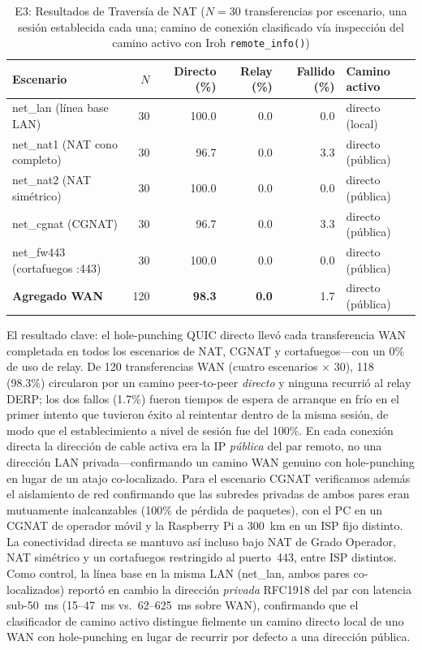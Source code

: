 \documentclass[journal]{IEEEtran}
\begin{document}
\begin{table}[t]
\centering
\caption{E3: Resultados de Traversía de NAT ($N{=}30$ transferencias por escenario, una sesión establecida cada una; camino de conexión clasificado vía inspección del camino activo con Iroh \texttt{remote\_info()})}
\label{tab:e3}
\footnotesize
\begin{tabular}{l r r r r l}
\toprule
\textbf{Escenario} & \textbf{$N$} & \textbf{Directo (\%)} & \textbf{Relay (\%)} & \textbf{Fallido (\%)} & \textbf{Camino activo} \\
\midrule
net\_lan   (línea base LAN)   & 30 & 100.0 & 0.0 & 0.0 & directo (local)  \\
net\_nat1  (NAT cono completo) & 30 & 96.7  & 0.0 & 3.3 & directo (pública) \\
net\_nat2  (NAT simétrico)    & 30 & 100.0 & 0.0 & 0.0 & directo (pública) \\
net\_cgnat (CGNAT)            & 30 & 96.7  & 0.0 & 3.3 & directo (pública) \\
net\_fw443 (cortafuegos :443) & 30 & 100.0 & 0.0 & 0.0 & directo (pública) \\
\midrule
\textbf{Agregado WAN}         & 120 & \textbf{98.3} & \textbf{0.0} & 1.7 & directo (pública) \\
\bottomrule
\end{tabular}
\end{table}

El resultado clave: el hole-punching QUIC directo llevó cada transferencia WAN completada en todos los escenarios de NAT, CGNAT y cortafuegos---con un 0\% de uso de relay. De 120 transferencias WAN (cuatro escenarios $\times$ 30), 118 (98.3\%) circularon por un camino peer-to-peer \emph{directo} y ninguna recurrió al relay DERP; los dos fallos (1.7\%) fueron tiempos de espera de arranque en frío en el primer intento que tuvieron éxito al reintentar dentro de la misma sesión, de modo que el establecimiento a nivel de sesión fue del 100\%. En cada conexión directa la dirección de cable activa era la IP \emph{pública} del par remoto, no una dirección LAN privada---confirmando un camino WAN genuino con hole-punching en lugar de un atajo co-localizado. Para el escenario CGNAT verificamos además el aislamiento de red confirmando que las subredes privadas de ambos pares eran mutuamente inalcanzables (100\% de pérdida de paquetes), con el PC en un CGNAT de operador móvil y la Raspberry Pi a 300~km en un ISP fijo distinto. La conectividad directa se mantuvo así incluso bajo NAT de Grado Operador, NAT simétrico y un cortafuegos restringido al puerto~443, entre ISP distintos. Como control, la línea base en la misma LAN (net\_lan, ambos pares co-localizados) reportó en cambio la dirección \emph{privada} RFC1918 del par con latencia sub-50~ms (15--47~ms vs.~62--625~ms sobre WAN), confirmando que el clasificador de camino activo distingue fielmente un camino directo local de uno WAN con hole-punching en lugar de recurrir por defecto a una dirección pública.
\end{document}
